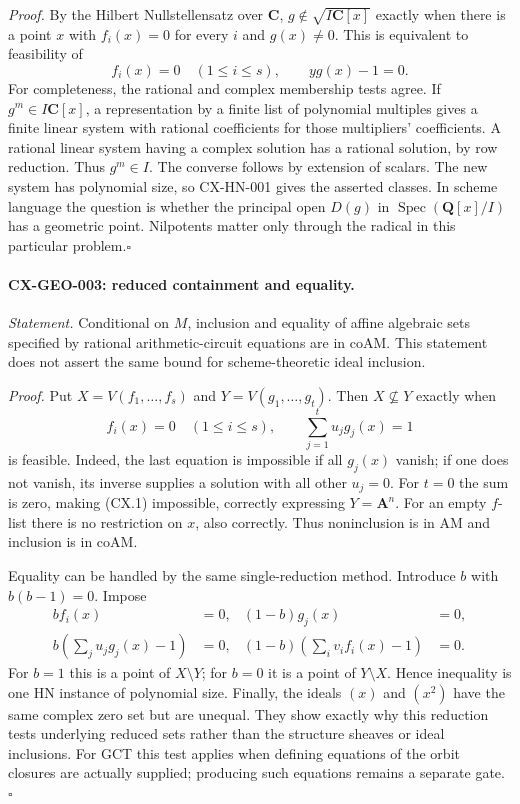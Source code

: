 \documentclass[11pt,a4paper]{article}
\begin{document}
\emph{Proof.} By the Hilbert Nullstellensatz over $\mathbf C$,
$g\notin\sqrt{I\mathbf C[x]}$ exactly when there is a point $x$ with
$f_i(x)=0$ for every $i$ and $g(x)\ne0$. This is equivalent to feasibility of
\[
               f_i(x)=0\quad(1\leq i\leq s),\qquad y g(x)-1=0.
\]
For completeness, the rational and complex membership tests agree. If
$g^m\in I\mathbf C[x]$, a representation by a finite list of polynomial
multiples gives a finite linear system with rational coefficients for those
multipliers' coefficients. A rational linear system having a complex solution
has a rational solution, by row reduction. Thus $g^m\in I$. The converse
follows by extension of scalars. The new system has polynomial size, so
CX-HN-001 gives the asserted classes. In scheme language the question is
whether the principal open $D(g)$ in $\operatorname{Spec}(\mathbf Q[x]/I)$
has a geometric point. Nilpotents matter only through the radical in this
particular problem.\hfill$\square$

\paragraph{CX-GEO-003: reduced containment and equality.}
\emph{Statement.} Conditional on $M$, inclusion and equality of affine
algebraic sets specified by rational arithmetic-circuit equations are in
$\mathrm{coAM}$. This statement does not assert the same bound for
scheme-theoretic ideal inclusion.

\emph{Proof.} Put $X=V(f_1,\ldots,f_s)$ and
$Y=V(g_1,\ldots,g_t)$. Then $X\nsubseteq Y$ exactly when
\[
        f_i(x)=0\quad(1\leq i\leq s),\qquad
        \sum_{j=1}^t u_jg_j(x)=1                              \tag{CX.1}
\]
is feasible. Indeed, the last equation is impossible if all $g_j(x)$ vanish;
if one does not vanish, its inverse supplies a solution with all other
$u_j=0$. For $t=0$ the sum is zero, making (CX.1) impossible, correctly
expressing $Y=\mathbf A^n$. For an empty $f$-list there is no restriction
on $x$, also correctly. Thus noninclusion is in $\mathrm{AM}$ and
inclusion is in $\mathrm{coAM}$.

Equality can be handled by the same single-reduction method. Introduce
$b$ with $b(b-1)=0$. Impose
\[
\begin{aligned}
 b f_i(x)&=0,& (1-b)g_j(x)&=0,\\
 b\left(\sum_j u_jg_j(x)-1\right)&=0,&
 (1-b)\left(\sum_i v_if_i(x)-1\right)&=0.
\end{aligned}
\]
For $b=1$ this is a point of $X\setminus Y$; for $b=0$ it is a point
of $Y\setminus X$. Hence inequality is one HN instance of polynomial size.
Finally, the ideals $(x)$ and $(x^2)$ have the same complex zero set but
are unequal. They show exactly why this reduction tests underlying reduced
sets rather than the structure sheaves or ideal inclusions.
For GCT this test applies when defining equations of the orbit closures
are actually supplied; producing such equations remains a separate gate.
\hfill$\square$
\end{document}
